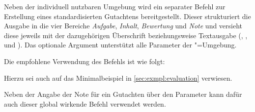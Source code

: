 \documentclass[english,ngerman]{tudscrman3}
\begin{document}
\begin{Declaration}{\LParameter%
}
\printdeclarationlist%
%
Neben der individuell nutzbaren Umgebung  wird ein 
separater Befehl zur Erstellung eines standardisierten Gutachtens 
bereitgestellt. Dieser strukturiert die Ausgabe in die vier Bereiche 
\emph{Aufgabe}, \emph{Inhalt}, \emph{Bewertung} und \emph{Note} und versieht 
diese jeweils mit der dazugehörigen Überschrift beziehungsweise Textausgabe 
(, ,  und 
). Das optionale Argument unterstützt alle Parameter der 
"=Umgebung.
%
\end{Declaration}
%
\begin{Example}
Die empfohlene Verwendung des Befehls  ist wie folgt:
\begin{Code}[escapechar=§]
\end{Code}
Hierzu sei auch auf das Minimalbeispiel in \autoref{sec:exmpl:evaluation} 
verwiesen.
\end{Example}

\begin{Declaration}{}
\printdeclarationlist%
%
Neben der Angabe der Note für ein Gutachten über den Parameter 
 kann dafür auch dieser global wirkende 
Befehl verwendet werden.
\end{Declaration}

\end{document}

